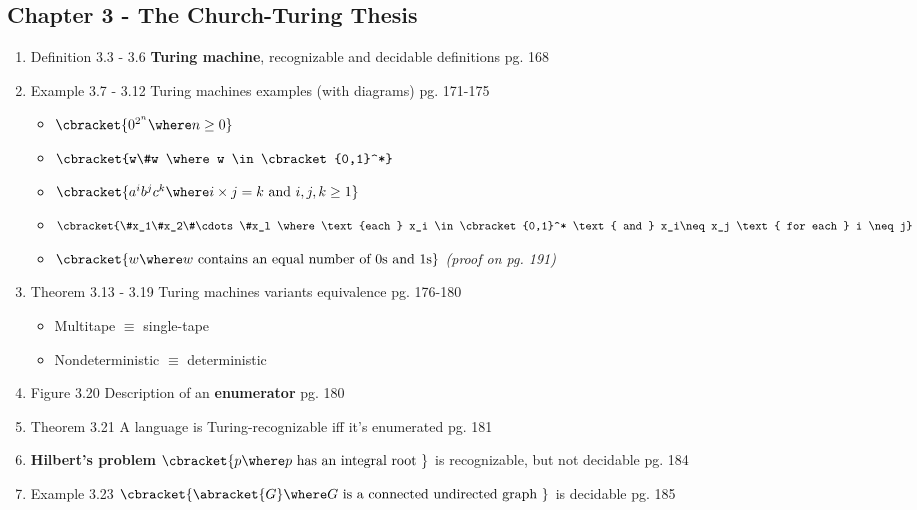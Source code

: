 \documentclass[12pt]{article} %
\newcommand{\theoremitem}[3]{\item #1 \quad #2 \dotfill #3}
\newenvironment{theoremlist} {
    \begin{enumerate}[nosep,leftmargin=*,label={}]
} {
    \end{enumerate}
}
\begin{document}
\subsection{Chapter 3 - The Church-Turing Thesis}
\begin{theoremlist}
    \theoremitem{Definition 3.3 - 3.6}
    {\textbf{Turing machine}, recognizable and decidable definitions}
    {pg. 168}
    \theoremitem{Example 3.7 - 3.12}
    {Turing machines examples (with diagrams)}
    {pg. 171-175}
    \begin{itemize}[nosep]
        \item {$\cbracket{0^{2^n} \where n \geq 0}$}
        \item {$\cbracket{w\#w \where w \in \cbracket{0,1}^*}$}
        \item {$\cbracket{a^i b^j c^k \where i\times j = k \text{ and } i,j,k \geq 1}$}
        \item {$\cbracket{\#x_1\#x_2\#\cdots\#x_l \where
        \text{each } x_i \in \cbracket{0,1}^* \text{ and } x_i\neq x_j \text{ for each } i \neq j}$}
        \item {$\cbracket{w \where w \text{ contains an equal number of 0s and 1s}}$ \textit{(proof on pg. 191)}}
    \end{itemize}
    \theoremitem{Theorem 3.13 - 3.19}
    {Turing machines variants equivalence}
    {pg. 176-180}
    \begin{itemize}[nosep]
        \item {Multitape $\equiv$ single-tape}
        \item {Nondeterministic $\equiv$ deterministic}
    \end{itemize}
    \theoremitem{Figure 3.20}
    {Description of an \textbf{enumerator}}
    {pg. 180}
    \theoremitem{Theorem 3.21}
    {A language is Turing-recognizable iff it's enumerated}
    {pg. 181}
    \theoremitem{\textbf{Hilbert’s problem}}
    {$\cbracket{p \where p \text{ has an integral root }}$ is recognizable, but not decidable}
    {pg. 184}
    \theoremitem{Example 3.23}
    {$\cbracket{\abracket{G} \where G \text{ is a connected undirected graph }}$ is decidable}
    {pg. 185}


\end{theoremlist}
\end{document}
